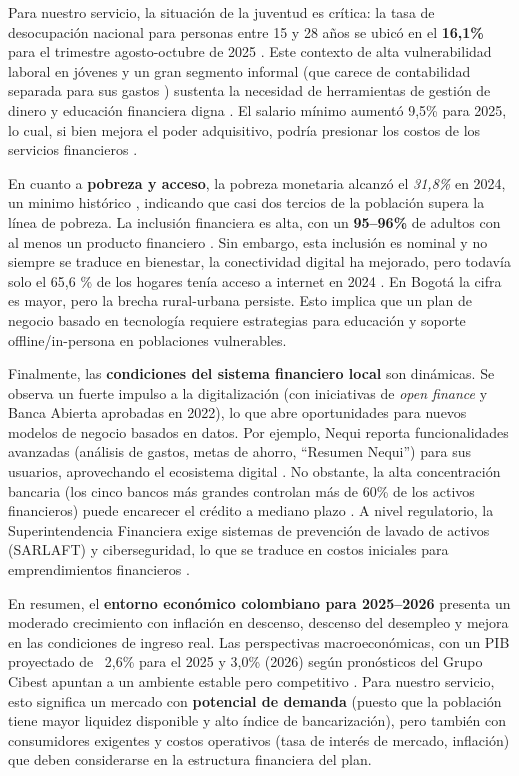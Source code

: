 Para nuestro servicio, la situación de la juventud es crítica: la tasa de desocupación nacional para personas entre 15 y 28 años se ubicó en el \textbf{16,1\%} para el trimestre agosto-octubre de 2025 \parencite[p. 1]{DANE_Juventud2025}. Este contexto de alta vulnerabilidad laboral en jóvenes y un gran segmento informal (que carece de contabilidad separada para sus gastos \parencite[p. 16]{DANE01}) sustenta la necesidad de herramientas de gestión de dinero y educación financiera digna \parencite[p. 20]{RevistaCIES01}. El salario mínimo aumentó 9,5\% para 2025, lo cual, si bien mejora el poder adquisitivo, podría presionar los costos de los servicios financieros \parencite[p. 4]{Departamento01}.

En cuanto a \textbf{pobreza y acceso}, la pobreza monetaria alcanzó el \textit{31,8\%} en 2024, un minimo histórico \parencite[p. 13]{DANE_Pobreza2024}, indicando que casi dos tercios de la población supera la línea de pobreza. La inclusión financiera es alta, con un \textbf{95–96\%} de adultos con al menos un producto financiero \parencite[p. 2]{BancadeOportunidades01}. Sin embargo, esta inclusión es nominal y no siempre se traduce en bienestar, la conectividad digital ha mejorado, pero todavía solo el 65,6 \% de los hogares tenía acceso a internet en 2024 \parencite[p. 14-15]{DANE_Internet2023}. En Bogotá la cifra es mayor, pero la brecha rural-urbana persiste. Esto implica que un plan de negocio basado en tecnología requiere estrategias para educación y soporte offline/in-persona en poblaciones vulnerables.

Finalmente, las \textbf{condiciones del sistema financiero local} son dinámicas. Se observa un fuerte impulso a la digitalización (con iniciativas de \textit{open finance} y Banca Abierta aprobadas en 2022), lo que abre oportunidades para nuevos modelos de negocio basados en datos. Por ejemplo, Nequi reporta funcionalidades avanzadas (análisis de gastos, metas de ahorro, ``Resumen Nequi'') para sus usuarios, aprovechando el ecosistema digital \parencite{Nequi01}. No obstante, la alta concentración bancaria (los cinco bancos más grandes controlan más de 60\% de los activos financieros) puede encarecer el crédito a mediano plazo \parencite{RankingsLATAM01}. A nivel regulatorio, la Superintendencia Financiera exige sistemas de prevención de lavado de activos (SARLAFT) y ciberseguridad, lo que se traduce en costos iniciales para emprendimientos financieros \parencite{InfoLaft01}.

En resumen, el \textbf{entorno económico colombiano para 2025–2026} presenta un moderado crecimiento con inflación en descenso, descenso del desempleo y mejora en las condiciones de ingreso real. Las perspectivas macroeconómicas, con un PIB proyectado de ~2,6\% para el 2025 y 3,0\% (2026) según pronósticos del Grupo Cibest apuntan a un ambiente estable pero competitivo \parencite{Bancolombia01}. Para nuestro servicio, esto significa un mercado con \textbf{potencial de demanda} (puesto que la población tiene mayor liquidez disponible y alto índice de bancarización), pero también con consumidores exigentes y costos operativos (tasa de interés de mercado, inflación) que deben considerarse en la estructura financiera del plan.